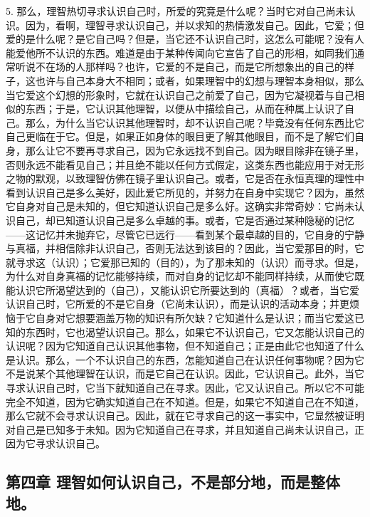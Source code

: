 5. 那么，理智热切寻求认识自己时，所爱的究竟是什么呢？当时它对自己尚未认识。因为，看啊，理智寻求认识自己，并以求知的热情激发自己。因此，它爱；但爱的是什么呢？是它自己吗？但是，当它还不认识自己时，这怎么可能呢？没有人能爱他所不认识的东西。难道是由于某种传闻向它宣告了自己的形相，如同我们通常听说不在场的人那样吗？也许，它爱的不是自己，而是它所想象出的自己的样子，这也许与自己本身大不相同；或者，如果理智中的幻想与理智本身相似，那么当它爱这个幻想的形象时，它就在认识自己之前爱了自己，因为它凝视着与自己相似的东西；于是，它认识其他理智，以便从中描绘自己，从而在种属上认识了自己。那么，为什么当它认识其他理智时，却不认识自己呢？毕竟没有任何东西比它自己更临在于它。但是，如果正如身体的眼目更了解其他眼目，而不是了解它们自身，那么让它不要再寻求自己，因为它永远找不到自己。因为眼目除非在镜子里，否则永远不能看见自己；并且绝不能以任何方式假定，这类东西也能应用于对无形之物的默观，以致理智仿佛在镜子里认识自己。或者，它是否在永恒真理的理性中看到认识自己是多么美好，因此爱它所见的，并努力在自身中实现它？因为，虽然它自身对自己是未知的，但它知道认识自己是多么好。这确实非常奇妙：它尚未认识自己，却已知道认识自己是多么卓越的事。或者，它是否通过某种隐秘的记忆——这记忆并未抛弃它，尽管它已远行——看到某个最卓越的目的，它自身的宁静与真福，并相信除非认识自己，否则无法达到该目的？因此，当它爱那目的时，它就寻求这（认识）；它爱那已知的（目的），为了那未知的（认识）而寻求。但是，为什么对自身真福的记忆能够持续，而对自身的记忆却不能同样持续，从而使它既能认识它所渴望达到的（自己），又能认识它所要达到的（真福）？或者，当它爱认识自己时，它所爱的不是它自身（它尚未认识），而是认识的活动本身；并更烦恼于它自身对它想要涵盖万物的知识有所欠缺？它知道什么是认识；而当它爱这已知的东西时，它也渴望认识自己。那么，如果它不认识自己，它又怎能认识自己的认识呢？因为它知道自己认识其他事物，但不知道自己；正是由此它也知道了什么是认识。那么，一个不认识自己的东西，怎能知道自己在认识任何事物呢？因为它不是说某个其他理智在认识，而是它自己在认识。因此，它认识自己。此外，当它寻求认识自己时，它当下就知道自己在寻求。因此，它又认识自己。所以它不可能完全不知道，因为它确实知道自己在不知道。但是，如果它不知道自己在不知道，那么它就不会寻求认识自己。因此，就在它寻求自己的这一事实中，它显然被证明对自己是已知多于未知。因为它知道自己在寻求，并且知道自己尚未认识自己，正因为它寻求认识自己。\par


\subsection{第四章 理智如何认识自己，不是部分地，而是整体地。}

